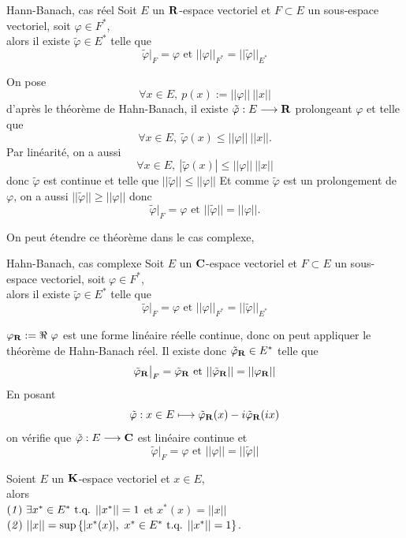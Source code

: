 \documentclass[a4paper,11pt, twoside]{article}
\begin{document}
\begin{thC}{Hann-Banach, cas réel}
  Soit $E$ un $\mathbf R$-espace vectoriel et $F\subset E$ un sous-espace vectoriel, soit $\varphi\in F^*$,\\

  alors il existe $\tilde\varphi\in E^*$ telle que 
  $$\tilde\varphi\big|_F=\varphi\text{ et }||\varphi||_{F^*}=||\tilde\varphi||_{E^*}$$
\end{thC}


\begin{Proof}
  On pose 
  $$\forall x\in E,\ p(x):=||\varphi||\ ||x||$$
  d'après le théorème de Hahn-Banach, il existe $\tilde\varphi:E\longrightarrow\mathbf R$ prolongeant $\varphi$ et telle que 
  $$\forall x\in E,\ \tilde\varphi(x)\leqslant ||\varphi||\ ||x||.$$
  Par linéarité, on a aussi 
  $$\forall x\in E,\ |\tilde\varphi(x)|\leqslant ||\varphi||\ ||x||$$
  donc $\tilde\varphi$ est continue et telle que $||\tilde\varphi||\leqslant ||\varphi||$
  Et comme $\tilde\varphi$ est un prolongement de $\varphi$, on a aussi $||\tilde\varphi||\geqslant ||\varphi||$ donc 
  $$\tilde\varphi\big|_F =\varphi\text{ et }||\tilde\varphi||= ||\varphi||.$$
\end{Proof}

On peut étendre ce théorème dans le cas complexe, 


\begin{thC}{Hahn-Banach, cas complexe}
  Soit $E$ un $\mathbf C$-espace vectoriel et $F\subset E$ un sous-espace vectoriel, soit $\varphi\in F^*$,\\

  alors il existe $\tilde\varphi\in E^*$ telle que 
  $$\tilde\varphi\big|_F=\varphi\text{ et }||\varphi||_{F^*}=||\tilde\varphi||_{E^*}$$
\end{thC}
  

\begin{Proof}
  $\varphi_\mathbf R:=\Re\ \varphi$ est une forme linéaire réelle continue, donc on peut appliquer le théorème de Hahn-Banach réel. Il existe donc $\tilde\varphi_\mathbf R\in E^*$ telle que 
  $$\tilde\varphi_\mathbf R\big|_F=\tilde\varphi_\mathbf R\text{ et }||\tilde\varphi_\mathbf R||=||\varphi_\mathbf R||$$
  En posant 
  $$\tilde\varphi:x\in E\longmapsto \tilde\varphi_\mathbf R(x)-i\tilde\varphi_\mathbf R(ix)$$
  on vérifie que $\tilde\varphi:E\longrightarrow\mathbf C$ est linéaire continue et 
  $$\tilde\varphi\big|_F=\varphi\text{ et }||\varphi||=||\tilde\varphi||$$
\end{Proof}


\begin{corollaire}
  Soient $E$ un $\mathbf K$-espace vectoriel et $x\in E$,\\

  alors\\
  $(\mathit 1)\ \exists x^*\in E^*\text{ t.q. } ||x^*||=1$ et $x^*(x)=||x||$\\[1em]
  $(\mathit 2)\ ||x||=\mathrm{sup}\left\{|x^*(x)|,\ x^*\in E^*\tq ||x^*||=1\right\}$.
\end{corollaire}
\end{document}
